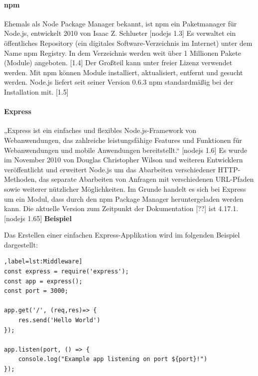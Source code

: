 \paragraph{npm}
Ehemals als Node Package Manager bekannt, ist npm ein Paketmanager für Node.js, entwickelt 2010 von Isaac Z. Schlueter [nodejs 1.3] Es verwaltet ein öffentliches Repository (ein digitales Software-Verzeichnis im Internet) unter dem Name npm Registry. In dem Verzeichnis werden weit über 1 Millionen Pakete (Module) angeboten. [1.4] Der Großteil kann unter freier Lizenz verwendet werden. Mit npm können Module installiert, aktualisiert, entfernt und gesucht werden. Node.js liefert seit seiner Version 0.6.3 npm standardmäßig bei der Installation mit. [1.5]

\paragraph{Express}
„Express ist ein einfaches und flexibles Node.js-Framework von Webanwendungen, das zahlreiche leistungsfähige Features und Funktionen für Webanwendungen und mobile Anwendungen bereitstellt.“ [nodejs 1.6] Es wurde im November 2010 von Douglas Christopher Wilson und weiteren Entwicklern veröffentlicht und erweitert Node.js um das Abarbeiten verschiedener HTTP-Methoden, das separate Abarbeiten von Anfragen mit verschiedenen URL-Pfaden sowie weiterer nützlicher Möglichkeiten. Im Grunde handelt es sich bei Express um ein Modul, dass durch den npm Package Manager heruntergeladen werden kann. Die aktuelle Version zum Zeitpunkt der Dokumentation [??] ist 4.17.1. [nodejs 1.65] \newline
\newline
\textbf{Beispiel}
 \newline

Das Erstellen einer einfachen Express-Applikation wird im folgenden Beispiel dargestellt:\newline

\begin{lstlisting}[caption=Einfacher Webserver [nodejs 1.8],label=lst:Middleware]
const express = require('express');
const app = express();
const port = 3000;

app.get('/', (req,res)=> {
	res.send('Hello World')
});

app.listen(port, () => {
	console.log("Example app listening on port ${port}!")
});
\end{lstlisting}



